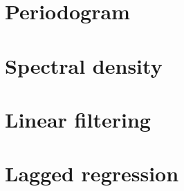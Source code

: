 \documentclass{article}
\begin{document}
\section{Periodogram}

\section{Spectral density}

\section{Linear filtering}

\section{Lagged regression}
\end{document}
